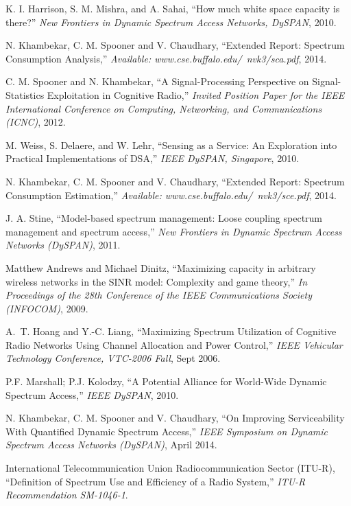 \documentclass[12pt, draftclsnofoot, onecolumn]{IEEEtran}
\begin{document}
\begin{thebibliography}{10}
{K. I. Harrison, S. M. Mishra, and A. Sahai}, ``How much white space capacity
  is there?'' \emph{{New Frontiers in Dynamic Spectrum Access Networks,
  DySPAN}}, 2010.

{N. Khambekar, C. M. Spooner and V. Chaudhary}, ``{Extended Report: Spectrum
  Consumption Analysis},'' \emph{{Available:
  www.cse.buffalo.edu/~nvk3/sca.pdf}}, 2014.

{C. M. Spooner and N. Khambekar}, ``{A Signal-Processing Perspective on
  Signal-Statistics Exploitation in Cognitive Radio},'' \emph{{Invited Position
  Paper for the IEEE International Conference on Computing, Networking, and
  Communications (ICNC)}}, 2012.

{M. Weiss, S. Delaere, and W. Lehr}, ``{Sensing as a Service: An Exploration
  into Practical Implementations of DSA},'' \emph{{IEEE DySPAN, Singapore}},
  2010.

{N. Khambekar, C. M. Spooner and V. Chaudhary}, ``{Extended Report: Spectrum
  Consumption Estimation},'' \emph{{Available:
  www.cse.buffalo.edu/~nvk3/sce.pdf}}, 2014.

{J. A. Stine}, ``{Model-based spectrum management: Loose coupling spectrum
  management and spectrum access},'' \emph{New Frontiers in Dynamic Spectrum
  Access Networks (DySPAN)}, 2011.

{{Matthew Andrews and Michael Dinitz}}, ``{Maximizing capacity in arbitrary
  wireless networks in the SINR model: Complexity and game theory},'' \emph{In
  Proceedings of the 28th Conference of the IEEE Communications Society
  (INFOCOM)}, 2009.

A.~T. Hoang and Y.-C. Liang, ``{Maximizing Spectrum Utilization of Cognitive
  Radio Networks Using Channel Allocation and Power Control},'' \emph{{IEEE
  Vehicular Technology Conference, VTC-2006 Fall}}, Sept 2006.

{P.F. Marshall; P.J. Kolodzy}, ``{A Potential Alliance for World-Wide Dynamic
  Spectrum Access},'' \emph{{IEEE DySPAN}}, 2010.

{N. Khambekar, C. M. Spooner and V. Chaudhary}, ``{On Improving Serviceability
  With Quantified Dynamic Spectrum Access},'' \emph{IEEE Symposium on Dynamic
  Spectrum Access Networks (DySPAN)}, April 2014.

{International Telecommunication Union Radiocommunication Sector (ITU-R)},
  ``{Definition of Spectrum Use and Efficiency of a Radio System},''
  \emph{ITU-R Recommendation SM-1046-1}.


\end{thebibliography}
\end{document}
